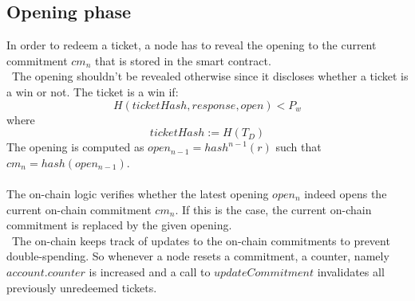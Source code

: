 \subsection{Opening phase}
In order to redeem a ticket, a node has to reveal the opening to the current commitment $cm_n$ that is stored in the smart contract. 
\\~The opening shouldn’t be revealed otherwise since it discloses whether a ticket is a win or not.
The ticket is a win if: $$H( ticketHash, response, open ) <P_w$$ where $$ticketHash:=H(T_D)$$
The opening is computed as $open_{n-1} = hash^{n-1}(r)$ such that $cm_n=hash( open_{n-1})$. 
\\~\\The on-chain logic verifies whether the latest opening $open_n$ indeed opens the current on-chain commitment $cm_n$. 
If this is the case, the current on-chain commitment is replaced by the given opening. 
\\~The on-chain keeps track of updates to the on-chain commitments to prevent double-spending. 
So whenever a node resets a commitment, a counter, namely $account.counter$ is increased and a call to $updateCommitment$ invalidates all previously unredeemed tickets.








